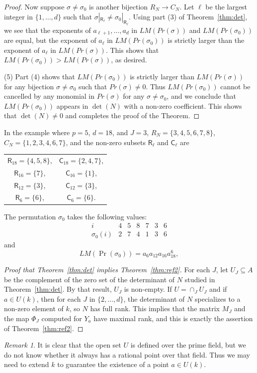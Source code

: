 \documentclass[12pt,reqno]{amsart}
\numberwithin{equation}{section}
\theoremstyle{plain}
\theoremstyle{definition}
\theoremstyle{remark}
\newtheorem{rem}[subsection]{Remark}
\numberwithin{equation}{section}
\newcommand{\<}{\langle}
\renewcommand{\>}{\rangle}
\newcommand{\Rs}{\mathsf{R}}
\newcommand{\Cs}{\mathsf{C}}
\begin{document}
\begin{proof}
  Now suppose $\sigma\neq\sigma_0$ is another bijection $R_N\to C_N$.
  Let $\ell$ be the largest integer in $\{1,\dots,d\}$ such that
  $\sigma |_{\Rs_\ell}\neq\sigma_{0}|_{\Rs_\ell}$. Using part (3) of
  Theorem~\ref{thm:det}, we see that the exponents of
  $a_{\ell+1},\dots,a_d$ in $LM(Pr(\sigma))$ and $LM(Pr(\sigma_0))$
  are equal, but the exponent of $a_\ell$ in $LM(Pr(\sigma_0))$ is
  strictly larger than the exponent of $a_\ell$ in $LM(Pr(\sigma))$.
  This shows that $LM(Pr(\sigma_0))>LM(Pr(\sigma))$, as desired.

  (5) Part (4) shows that $LM(Pr(\sigma_0))$ is strictly larger than
  $LM(Pr(\sigma))$ for any bijection $\sigma\neq\sigma_0$ such that
  $Pr(\sigma)\neq0$.  Thus $LM(Pr(\sigma_0))$ cannot be cancelled by
  any monomial in $Pr(\sigma)$ for any $\sigma\neq\sigma_0$, and we
  conclude that $LM(Pr(\sigma_0))$ appears in $\det(N)$ with a
  non-zero coefficient.  This shows that $\det(N)\neq0$ and completes
  the proof of the Theorem.
\end{proof}

In the example where $p=5$, $d=18$, and $J=3$, $R_N=\{3,4,5,6,7,8\}$,
$C_N=\{1,2,3,4,6,7\}$, and the non-zero subsets $\Rs_\ell$ and
$\Cs_\ell$ are
\begin{center}
\begin{tabular}{c c}
$\Rs_{18}=\{4,5,8\}$,&$\Cs_{18}=\{2,4,7\}$,\\
$\Rs_{16}=\{7\}$,&$\Cs_{16}=\{1\}$,\\
$\Rs_{12}=\{3\}$, &$\Cs_{12}=\{3\}$,\\
$\Rs_6=\{6\}$,&$\Cs_6=\{6\}$.  
\end{tabular}
\end{center}
The permutation $\sigma_0$ takes the following values:
\[    \begin{array}{c|cccccc}
      i & 4 & 5 & 8& 7 & 3 & 6\\
      \hline
      \sigma_0(i)&2& 7 & 4 & 1 & 3 & 6
    \end{array}\]
  and
  \[LM(\Pr(\sigma_0))=a_6a_{12}a_{16}a_{18}^6,\]
  \begin{proof}[Proof that Theorem~\ref{thm:det} implies
    Theorem~\ref{thm:ref2}]
    For each $J$, let $U_J\subseteq A$ be the complement of the zero set
    of the determinant of $N$ studied in Theorem~\ref{thm:det}.  By
    that result, $U_J$ is non-empty.  If $U=\cap_J U_J$ and if
    $a\in U(k)$, then for each $J$ in $\{2,\dots,d\}$, the determinant
    of $N$ specializes to a non-zero element of $k$, so $N$ has full
    rank.  This implies that the matrix $M_J$ and the map $\Phi_J$
    computed for $Y_a$ have maximal rank, and this is exactly the
    assertion of Theorem~\ref{thm:ref2}.
  \end{proof}


  \begin{rem}
    It is clear that the open set $U$ is defined over the prime field,
    but we do not know whether it always has a rational point over
    that field.  Thus we may need to extend $k$ to guarantee the
    existence of a point $a\in U(k)$.
  \end{rem}



\end{document}

